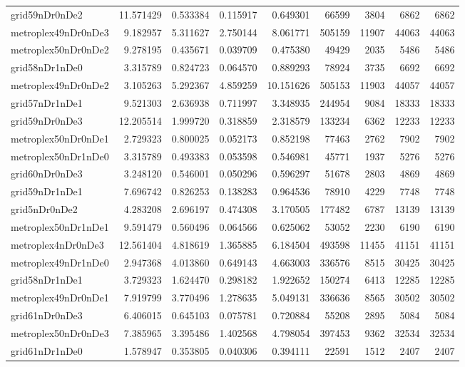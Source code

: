 \begin{longtable}{|l|r|r|r|r|r|r|r|r|}
grid59nDr0nDe2 & 11.571429 & 0.533384 & 0.115917 & 0.649301 & 66599 & 3804 & 6862 & 6862 \\
metroplex49nDr0nDe3 & 9.182957 & 5.311627 & 2.750144 & 8.061771 & 505159 & 11907 & 44063 & 44063 \\
metroplex50nDr0nDe2 & 9.278195 & 0.435671 & 0.039709 & 0.475380 & 49429 & 2035 & 5486 & 5486 \\
grid58nDr1nDe0 & 3.315789 & 0.824723 & 0.064570 & 0.889293 & 78924 & 3735 & 6692 & 6692 \\
metroplex49nDr0nDe2 & 3.105263 & 5.292367 & 4.859259 & 10.151626 & 505153 & 11903 & 44057 & 44057 \\
grid57nDr1nDe1 & 9.521303 & 2.636938 & 0.711997 & 3.348935 & 244954 & 9084 & 18333 & 18333 \\
grid59nDr0nDe3 & 12.205514 & 1.999720 & 0.318859 & 2.318579 & 133234 & 6362 & 12233 & 12233 \\
metroplex50nDr0nDe1 & 2.729323 & 0.800025 & 0.052173 & 0.852198 & 77463 & 2762 & 7902 & 7902 \\
metroplex50nDr1nDe0 & 3.315789 & 0.493383 & 0.053598 & 0.546981 & 45771 & 1937 & 5276 & 5276 \\
grid60nDr0nDe3 & 3.248120 & 0.546001 & 0.050296 & 0.596297 & 51678 & 2803 & 4869 & 4869 \\
grid59nDr1nDe1 & 7.696742 & 0.826253 & 0.138283 & 0.964536 & 78910 & 4229 & 7748 & 7748 \\
grid5nDr0nDe2 & 4.283208 & 2.696197 & 0.474308 & 3.170505 & 177482 & 6787 & 13139 & 13139 \\
metroplex50nDr1nDe1 & 9.591479 & 0.560496 & 0.064566 & 0.625062 & 53052 & 2230 & 6190 & 6190 \\
metroplex4nDr0nDe3 & 12.561404 & 4.818619 & 1.365885 & 6.184504 & 493598 & 11455 & 41151 & 41151 \\
metroplex49nDr1nDe0 & 2.947368 & 4.013860 & 0.649143 & 4.663003 & 336576 & 8515 & 30425 & 30425 \\
grid58nDr1nDe1 & 3.729323 & 1.624470 & 0.298182 & 1.922652 & 150274 & 6413 & 12285 & 12285 \\
metroplex49nDr0nDe1 & 7.919799 & 3.770496 & 1.278635 & 5.049131 & 336636 & 8565 & 30502 & 30502 \\
grid61nDr0nDe3 & 6.406015 & 0.645103 & 0.075781 & 0.720884 & 55208 & 2895 & 5084 & 5084 \\
metroplex50nDr0nDe3 & 7.385965 & 3.395486 & 1.402568 & 4.798054 & 397453 & 9362 & 32534 & 32534 \\
grid61nDr1nDe0 & 1.578947 & 0.353805 & 0.040306 & 0.394111 & 22591 & 1512 & 2407 & 2407 \\

\end{longtable}
